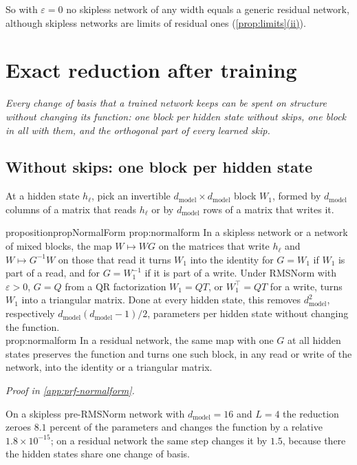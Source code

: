 \documentclass[10pt]{article}
\theoremstyle{definition}
\theoremstyle{remark}
\newcommand{\dm}{d_{\mathrm{model}}}
\newcommand{\takeaway}[1]{\noindent\textit{#1}\par\smallskip}
\newcommand{\ptlabel}[1]{\phantomsection\label{#1}}
\DeclareRobustCommand{\cpref}[2]{\hyperref[#1:#2]{\cref*{#1}(#2)}}
\newcommand{\proofin}[1]{\par\vspace{-0.4\baselineskip}\noindent\hfill{\small\itshape Proof in \cref{#1}.}\par\smallskip}
\newcommand{\stpart}[3]{\ifx\relax#1\relax\else\ptlabel{#1:#2}\fi{\upshape\bfseries\boldmath(#2)\ifx\relax#3\relax\else\ #3.\fi}}
\begin{document}
So with $\varepsilon = 0$ no skipless network of any width equals a generic residual network, although skipless networks are limits of residual ones (\cpref{prop:limits}{ii}).

\section{Exact reduction after training}\label{sec:reduce}

\takeaway{Every change of basis that a trained network keeps can be spent on structure without changing its function: one block per hidden state without skips, one block in all with them, and the orthogonal part of every learned skip.}

\subsection{Without skips: one block per hidden state}\label{sec:skipless}

At a hidden state $h_\ell$, pick an invertible $\dm \times \dm$ block $W_1$, formed by $\dm$ columns of a matrix that reads $h_\ell$ or by $\dm$ rows of a matrix that writes it.

\begin{restatable}{proposition}{propNormalForm}\label{prop:normalform}
\stpart{prop:normalform}{i}{} In a skipless network or a network of mixed blocks, the map $W \mapsto WG$ on the matrices that write $h_\ell$ and $W \mapsto G^{-1}W$ on those that read it turns $W_1$ into the identity for $G = W_1$ if $W_1$ is part of a read, and for $G = W_1^{-1}$ if it is part of a write. Under RMSNorm with $\varepsilon > 0$, $G = Q$ from a QR factorization $W_1 = QT$, or $W_1^\top = QT$ for a write, turns $W_1$ into a triangular matrix. Done at every hidden state, this removes $\dm^2$, respectively $\dm(\dm-1)/2$, parameters per hidden state without changing the function.\\
\stpart{prop:normalform}{ii}{} In a residual network, the same map with one $G$ at all hidden states preserves the function and turns one such block, in any read or write of the network, into the identity or a triangular matrix.
\end{restatable}
\proofin{app:prf-normalform}

On a skipless pre-RMSNorm network with $\dm = 16$ and $L = 4$ the reduction zeroes $8.1$ percent of the parameters and changes the function by a relative $1.8\times10^{-15}$; on a residual network the same step changes it by $1.5$, because there the hidden states share one change of basis.
\end{document}
